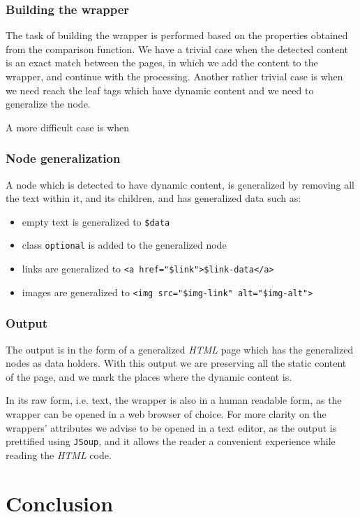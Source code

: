 \documentclass{article}
\begin{document}
	\subsubsection{Building the wrapper}
	The task of building the wrapper is performed based on the properties obtained from the comparison function. We have a trivial case when the detected content is an exact match between the pages, in which we add the content to the wrapper, and continue with the processing. Another rather trivial case is when we need reach the leaf tags which have dynamic content and we need to generalize the node. 
	
	A more difficult case is when 
	
	\subsubsection{Node generalization}
	A node which is detected to have dynamic content, is generalized by removing all the text within it, and its children, and has generalized data such as:
	\begin{itemize}
		\item empty text is generalized to \texttt{\$data}
		\item class \texttt{optional} is added to the generalized node
		\item links are generalized to \texttt{<a href="\$link">\$link-data</a>}
		\item images are generalized to \texttt{<img src="\$img-link" alt="\$img-alt">}
	\end{itemize}
	
	\subsubsection{Output}
	The output is in the form of a generalized \textit{HTML} page which has the generalized nodes as data holders. With this output we are preserving all the static content of the page, and we mark the places where the dynamic content is.
	
	In its raw form, i.e. text, the wrapper is also in a human readable form, as the wrapper can be opened in a web browser of choice. For more clarity on the wrappers' attributes we advise to be opened in a text editor, as the output is prettified using \texttt{JSoup}, and it allows the reader a convenient experience while reading the \textit{HTML} code.
	
	\section{Conclusion}
	
	
	
	
	
\end{document}
